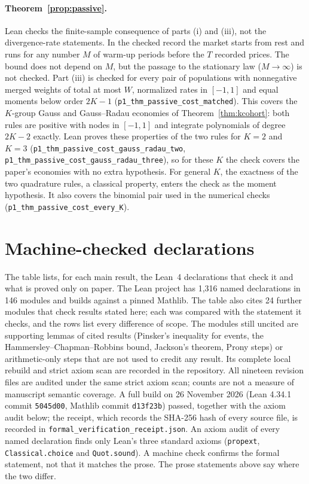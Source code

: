\documentclass[12pt]{article}
\theoremstyle{definition}
\theoremstyle{remark}
\begin{document}
\paragraph{Theorem~\ref{prop:passive}.}
Lean checks the finite-sample consequence of parts (i) and (iii), not the divergence-rate statements. In the checked record the market starts from rest and runs for any number $M$ of warm-up periods before the $T$ recorded prices. The bound does not depend on $M$, but the passage to the stationary law ($M\to\infty$) is not checked. Part (iii) is checked for every pair of populations with nonnegative merged weights of total at most $W$, normalized rates in $[-1,1]$ and equal moments below order $2K-1$ (\texttt{p1\_thm\_passive\_cost\_matched}). This covers the $K$-group Gauss and Gauss--Radau economies of Theorem~\ref{thm:kcohort}: both rules are positive with nodes in $[-1,1]$ and integrate polynomials of degree $2K-2$ exactly. Lean proves these properties of the two rules for $K=2$ and $K=3$ (\texttt{p1\_thm\_passive\_cost\_gauss\_radau\_two}, \texttt{p1\_thm\_passive\_cost\_gauss\_radau\_three}), so for these $K$ the check covers the paper's economies with no extra hypothesis. For general $K$, the exactness of the two quadrature rules, a classical property, enters the check as the moment hypothesis. It also covers the binomial pair used in the numerical checks (\texttt{p1\_thm\_passive\_cost\_every\_K}).

\section{Machine-checked declarations}\label{app:verification}

The table lists, for each main result, the Lean~4 declarations that check it and what is proved only on paper. The Lean project has 1,316 named declarations in 146 modules and builds against a pinned Mathlib. The table also cites 24 further modules that check results stated here; each was compared with the statement it checks, and the rows list every difference of scope. The modules still uncited are supporting lemmas of cited results (Pinsker's inequality for events, the Hammersley--Chapman--Robbins bound, Jackson's theorem, Prony steps) or arithmetic-only steps that are not used to credit any result. Its complete local rebuild and strict axiom scan are recorded in the repository. All nineteen revision files are audited under the same strict axiom scan; counts are not a measure of manuscript semantic coverage. A full build on 26 November 2026 (Lean 4.34.1 commit \texttt{5045d00}, Mathlib commit \texttt{d13f23b}) passed, together with the axiom audit below; the receipt, which records the SHA-256 hash of every source file, is recorded in \nolinkurl{formal_verification_receipt.json}. An axiom audit of every named declaration finds only Lean's three standard axioms (\texttt{propext}, \texttt{Classical.choice} and \texttt{Quot.sound}). A machine check confirms the formal statement, not that it matches the prose. The prose statements above say where the two differ.
\end{document}
